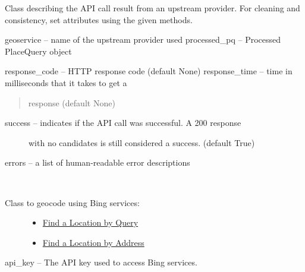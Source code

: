 \documentclass[letterpaper,10pt,english]{sphinxmanual}
\begin{document}
\begin{fulllineitems}
\label{index:omgeo.services.base.UpstreamResponseInfo}
Class describing the API call result from an upstream provider.
For cleaning and consistency, set attributes using the given methods.

geoservice       -- name of the upstream provider used
processed\_pq     -- Processed PlaceQuery object

response\_code    -- HTTP response code (default None)
response\_time    -- time in milliseconds that it takes to get a
\begin{quote}

response (default None)
\end{quote}
\begin{description}
\item[{success          -- indicates if the API call was successful. A 200 response}] \leavevmode
with no candidates is still considered a success.
(default True)

\end{description}

errors           -- a list of human-readable error descriptions

\end{fulllineitems}

\label{index:module-omgeo.services}

\begin{fulllineitems}
\label{index:omgeo.services.Bing}~\begin{description}
\item[{Class to geocode using Bing services:}] \leavevmode\begin{itemize}
\item {} 
\href{http://msdn.microsoft.com/en-us/library/ff701711.aspx}{Find a Location by Query}

\item {} 
\href{http://msdn.microsoft.com/en-us/library/ff701714.aspx}{Find a Location by Address}

\end{itemize}

\end{description}

api\_key --  The API key used to access Bing services.

\end{fulllineitems}
\end{document}
